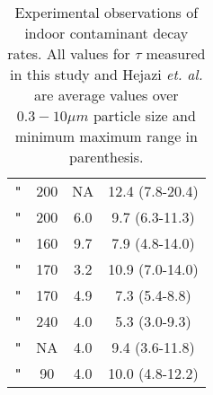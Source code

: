 \documentclass[preprint]{elsarticle}
\newcommand*{\ditto}{\texttt{"}}
\begin{document}
\begin{table}
\begin{tabular}{c c c c}
\ditto & 200 & NA & 12.4 (7.8-20.4)\\

\ditto & 200 & 6.0 & 9.7 (6.3-11.3)\\

\ditto & 160 & 9.7 & 7.9 (4.8-14.0)\\

\ditto & 170 & 3.2 & 10.9 (7.0-14.0)\\

\ditto & 170 & 4.9 & 7.3 (5.4-8.8)\\

\ditto & 240 & 4.0 & 5.3 (3.0-9.3)\\

\ditto & NA & 4.0 & 9.4 (3.6-11.8)\\

\ditto & 90 & 4.0 & 10.0 (4.8-12.2)\\

\hline

\end{tabular}

\caption{
Experimental observations of indoor contaminant decay rates. All values for $\tau$ measured in this study and Hejazi \textit{et. al.} are average values over $0.3-10 \mu m$ particle size and minimum maximum range in parenthesis.
}
\label{table:lit}
\end{table}
\end{document}
